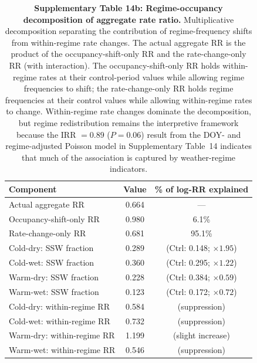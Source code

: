 \documentclass[11pt,letterpaper]{article}
\begin{document}

\begin{table}[!ht]
\centering
\caption{\textbf{Supplementary Table 14b: Regime-occupancy decomposition of aggregate rate ratio.}
Multiplicative decomposition separating the contribution of regime-frequency shifts from within-regime rate changes. The actual aggregate RR is the product of the occupancy-shift-only RR and the rate-change-only RR (with interaction). The occupancy-shift-only RR holds within-regime rates at their control-period values while allowing regime frequencies to shift; the rate-change-only RR holds regime frequencies at their control values while allowing within-regime rates to change. Within-regime rate changes dominate the decomposition, but regime redistribution remains the interpretive framework because the IRR $= 0.89$ ($P = 0.06$) result from the DOY- and regime-adjusted Poisson model in Supplementary Table~14 indicates that much of the association is captured by weather-regime indicators.}
\label{tab:regime_decomp}
\small
\begin{tabular}{lcc}
\toprule
Component & Value & \% of log-RR explained \\
\midrule
Actual aggregate RR & 0.664 & --- \\
Occupancy-shift-only RR & 0.980 & 6.1\% \\
Rate-change-only RR & 0.681 & 95.1\% \\
\midrule
Cold-dry: SSW fraction & 0.289 & (Ctrl: 0.148; $\times 1.95$) \\
Cold-wet: SSW fraction & 0.360 & (Ctrl: 0.295; $\times 1.22$) \\
Warm-dry: SSW fraction & 0.228 & (Ctrl: 0.384; $\times 0.59$) \\
Warm-wet: SSW fraction & 0.123 & (Ctrl: 0.172; $\times 0.72$) \\
\midrule
Cold-dry: within-regime RR & 0.584 & (suppression) \\
Cold-wet: within-regime RR & 0.732 & (suppression) \\
Warm-dry: within-regime RR & 1.199 & (slight increase) \\
Warm-wet: within-regime RR & 0.546 & (suppression) \\
\bottomrule
\end{tabular}
\end{table}
\end{document}
